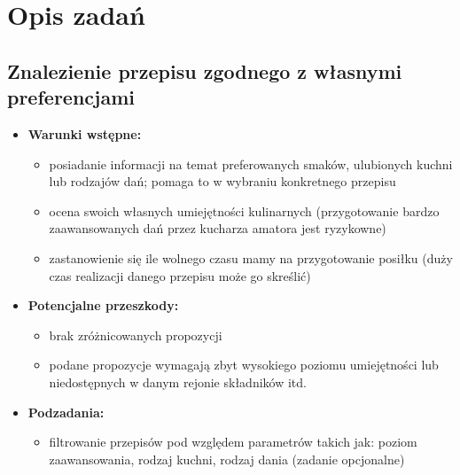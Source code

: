 \documentclass{article}
\begin{document}
\section{Opis zadań}
\subsection{Znalezienie przepisu zgodnego z własnymi preferencjami}
  \begin{itemize}
    \item \textbf{Warunki wstępne:}
      \begin{itemize}
        \item posiadanie informacji na temat preferowanych smaków, ulubionych kuchni lub rodzajów dań; pomaga to w wybraniu konkretnego przepisu
        \item ocena swoich własnych umiejętności kulinarnych (przygotowanie bardzo zaawansowanych dań przez kucharza amatora jest ryzykowne) 
        \item zastanowienie się ile wolnego czasu mamy na przygotowanie posiłku (duży czas realizacji danego przepisu może go skreślić)
      \end{itemize}
    \item \textbf{Potencjalne przeszkody:}
      \begin{itemize}
        \item brak zróżnicowanych propozycji
        \item podane propozycje wymagają zbyt wysokiego poziomu umiejętności lub niedostępnych w danym rejonie składników itd.
      \end{itemize}
    \item \textbf{Podzadania:}
      \begin{itemize}
        \item filtrowanie przepisów pod względem parametrów takich jak: poziom zaawansowania, rodzaj kuchni, rodzaj dania (zadanie opcjonalne)
      \end{itemize}
  \end{itemize}
\end{document}
